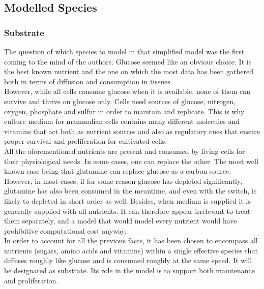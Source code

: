 \documentclass[11pt,a4paper]{article}
\begin{document}
\subsection{Modelled Species}


\subsubsection{Substrate}
The question of which species to model in that simplified model was the first coming to the mind of the authors. Glucose seemed like an obvious choice. It is the best known nutrient and the one on which the most data has been gathered both in terms of diffusion and consumption in tissues.\\

However, while all cells consume glucose when it is available, none of them can survive and thrive on glucose only. Cells need sources of glucose, nitrogen, oxygen, phosphate and sulfur in order to maintain and replicate. This is why culture medium for mammalian cells contains many different molecules and vitamins that act both as nutrient sources and also as regulatory cues that ensure proper survival and proliferation for cultivated cells.\\

All the aforementioned nutrients are present and consumed by living cells for their physiological needs. In some cases, one can replace the other. The most well known case being that glutamine can replace glucose as a carbon source.\cite{Stuart2023}\cite{Mazurek1997} However, in most cases, if for some reason glucose has depleted significantly, glutamine has also been consumed in the meantime, and even with the switch, is likely to depleted in short order as well. Besides, when medium is supplied it is generally supplied with all nutrients. It can therefore appear irrelevant to treat them separately, and a model that would model every nutrient would have prohibitive computational cost anyway.\\

In order to account for all the previous facts, it has been chosen to encompass all nutrients (sugars, amino acids and vitamins) within a single effective species that diffuses roughly like glucose and is consumed roughly at the same speed. It will be designated as substrate. Its role in the model is to support both maintenance and proliferation.\\
\end{document}
